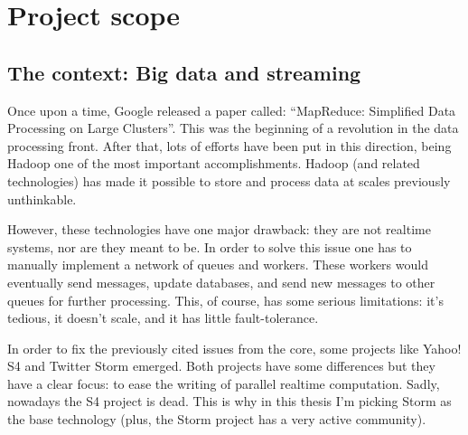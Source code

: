 %
%
%

\section{Project scope}

\subsection{The context: Big data and streaming}

Once upon a time, Google released a paper called: ``MapReduce: Simplified Data
Processing on Large Clusters''\cite{mapreduce}. This was the beginning of
a revolution in the data processing front. After that, lots of efforts
have been put in this direction, being Hadoop one of the most important
accomplishments. Hadoop (and related technologies) has made it possible
to store and process data at scales previously unthinkable.

However, these technologies have one major drawback: they are not realtime
systems, nor are they meant to be. In order to solve this issue one has to
manually implement a network of queues and workers. These workers would
eventually send messages, update databases, and send new messages to other
queues for further processing. This, of course, has some serious limitations:
it's tedious, it doesn't scale, and it has little fault-tolerance.

In order to fix the previously cited issues from the core, some projects like
Yahoo! S4 and Twitter Storm emerged. Both projects have some differences but
they have a clear focus: to ease the writing of parallel realtime computation.
Sadly, nowadays the S4 project is dead. This is why in this thesis I'm picking
Storm\cite{storm} as the base technology (plus, the Storm project has a very
active community).

